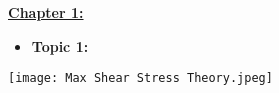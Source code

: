 \documentclass[9pt]{extarticle} %
\newcommand{\bfitem}[1]{\item \textbf{#1}}
\begin{document}
\begin{paracol}{2}

\noindent \underline{\textbf{Chapter 1:}}
\begin{itemize}[left=0pt, nosep]
    \bfitem{Topic 1:}
\end{itemize}

\switchcolumn 

\begin{minipage}[t]{0.45\textwidth}
    \raggedright
    \texttt{[image: Max Shear Stress Theory.jpeg]}
\end{minipage}
    
\end{paracol}
\end{document}
